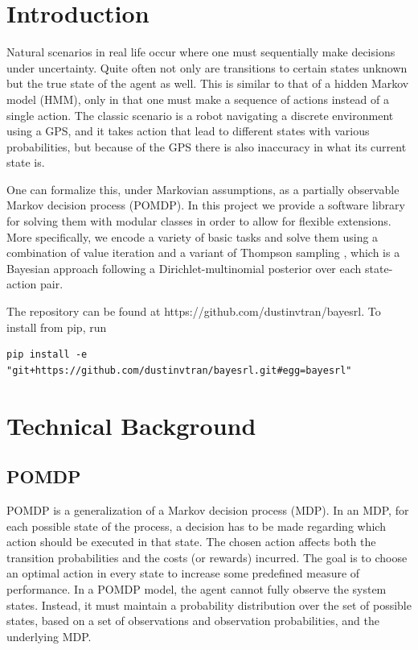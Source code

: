 \documentclass{pset}
\begin{document}

\section{Introduction}
Natural scenarios in real life occur where one must sequentially make decisions
under uncertainty. Quite often not only are transitions to certain states
unknown but the true state of the agent as well. This is similar to that of a
hidden Markov model (HMM), only in that one must make a sequence of actions
instead of a single action. The classic scenario is a robot navigating a
discrete environment using a GPS, and it takes action that lead to different
states with various probabilities, but because of the GPS there is also
inaccuracy in what its current state is.

One can formalize this, under Markovian assumptions, as a partially observable
Markov decision process (POMDP). In this project we provide a software
library for solving them with modular classes in order to allow for flexible
extensions.  More specifically, we encode a variety of basic tasks and solve
them using a combination of value iteration and a variant of Thompson sampling 
\cite{strens2000bayesian}, which is a Bayesian approach
following a Dirichlet-multinomial posterior over each state-action pair.

The repository can be found at https://github.com/dustinvtran/bayesrl. 
To install from pip, run 
\begin{lstlisting}
pip install -e "git+https://github.com/dustinvtran/bayesrl.git#egg=bayesrl"
\end{lstlisting}

\section{Technical Background}

\subsection{POMDP}
POMDP is a generalization of a Markov decision process (MDP). In an MDP, for each possible state of
the process, a decision has to be made regarding which action should be executed in that state. The
chosen action affects both the transition probabilities and the costs (or rewards) incurred. The
goal is to choose an optimal action in every state to increase some predefined measure of 
performance. In a POMDP model, the agent cannot fully observe the system states. 
Instead, it must maintain a probability distribution over the set of possible states, 
based on a set of observations and observation probabilities, and the underlying MDP.  
\end{document}
